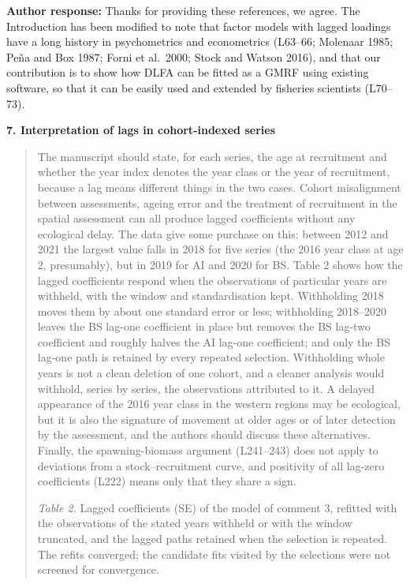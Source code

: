 \documentclass[11pt]{article}
\begin{document}
\textbf{Author response:} Thanks for providing these references, we
agree. The Introduction has been modified to note that factor models
with lagged loadings have a long history in psychometrics and
econometrics (L63--66; Molenaar 1985; Peña and Box 1987; Forni et
al.~2000; Stock and Watson 2016), and that our contribution is to show
how DLFA can be fitted as a GMRF using existing software, so that it can
be easily used and extended by fisheries scientists (L70--73).

\textbf{7. Interpretation of lags in cohort-indexed series}

\begin{quote}
The manuscript should state, for each series, the age at recruitment and
whether the year index denotes the year class or the year of
recruitment, because a lag means different things in the two cases.
Cohort misalignment between assessments, ageing error and the treatment
of recruitment in the spatial assessment can all produce lagged
coefficients without any ecological delay. The data give some purchase
on this: between 2012 and 2021 the largest value falls in 2018 for five
series (the 2016 year class at age 2, presumably), but in 2019 for AI
and 2020 for BS. Table 2 shows how the lagged coefficients respond when
the observations of particular years are withheld, with the window and
standardisation kept. Withholding 2018 moves them by about one standard
error or less; withholding 2018--2020 leaves the BS lag-one coefficient
in place but removes the BS lag-two coefficient and roughly halves the
AI lag-one coefficient; and only the BS lag-one path is retained by
every repeated selection. Withholding whole years is not a clean
deletion of one cohort, and a cleaner analysis would withhold, series by
series, the observations attributed to it. A delayed appearance of the
2016 year class in the western regions may be ecological, but it is also
the signature of movement at older ages or of later detection by the
assessment, and the authors should discuss these alternatives. Finally,
the spawning-biomass argument (L241--243) does not apply to deviations
from a stock--recruitment curve, and positivity of all lag-zero
coefficients (L222) means only that they share a sign.

\emph{Table 2.} Lagged coefficients (SE) of the model of comment 3,
refitted with the observations of the stated years withheld or with the
window truncated, and the lagged paths retained when the selection is
repeated. The refits converged; the candidate fits visited by the
selections were not screened for convergence.


\end{quote}
\end{document}
